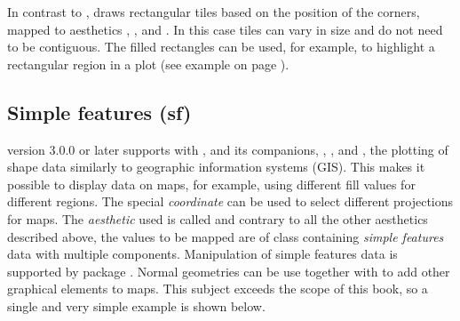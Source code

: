 \documentclass[krantz2]{krantz}\usepackage{knitr}
\begin{document}
In contrast to ,  draws rectangular tiles based on the position of the corners, mapped to aesthetics , ,  and . In this case tiles can vary in size and do not need to be contiguous. The filled rectangles can be used, for example, to highlight a rectangular region in a plot (see example on page \pageref{par:plot:inset:zoom}).

\subsection{Simple features (sf)}\label{sec:plot:sf}

\ggplot version 3.0.0 or later supports with , and its companions, , , and , the plotting of shape data similarly to geographic information systems (GIS). This makes it possible to display data on maps, for example, using different fill values for different regions. The special \emph{coordinate}  can be used to select different projections for maps. The \emph{aesthetic} used is called  and contrary to all the other aesthetics described above, the values to be mapped are of class  containing \emph{simple features} data with multiple components. Manipulation of simple features data is supported by package . Normal geometries can be use together with  to add other graphical elements to maps. This subject exceeds the scope of this book, so a single and very simple example is shown below.
\end{document}
